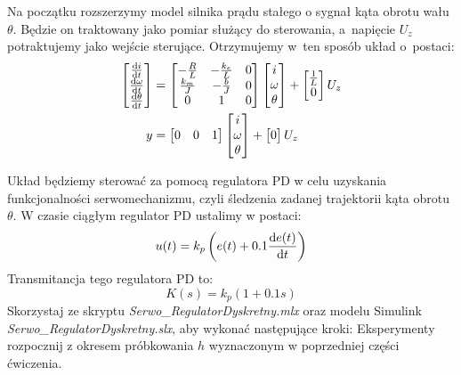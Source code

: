 \documentclass{sprawozdanie-agh}
\begin{document}
Na początku rozszerzymy model silnika prądu stałego o sygnał kąta obrotu wału $\theta$. Będzie on traktowany jako pomiar służący do sterowania, a~napięcie $U_z$ potraktujemy jako wejście sterujące. Otrzymujemy w~ten sposób układ o~postaci:
\begin{align*}
\begin{bmatrix} \dv{i}{t} \\  \dv{\omega}{t} \\ \dv{\theta}{t} \end{bmatrix} &= \begin{bmatrix} -\frac{R}{L} & -\frac{k_e}{L} & 0\\ \frac{k_m}{J} & -\frac{b}{J} & 0 \\ 0 & 1 & 0\end{bmatrix}\begin{bmatrix} i \\  \omega \\ \theta \end{bmatrix} + \begin{bmatrix} \frac{1}{L} \\ 0 \end{bmatrix} U_z  \\
y &= \begin{bmatrix} 0 & 0 &1  \end{bmatrix} \begin{bmatrix} i \\  \omega \\ \theta \end{bmatrix} + \begin{bmatrix} 0  \end{bmatrix} U_z 
\end{align*}

Układ będziemy sterować za pomocą regulatora PD w celu uzyskania funkcjonalności serwomechanizmu, czyli śledzenia zadanej trajektorii kąta obrotu $\theta$.
W czasie ciągłym regulator PD ustalimy w postaci:
\begin{equation*}
u(t) = k_p \left(e(t) + 0.1 \dv{e(t)}{t}\right)
\end{equation*}
Transmitancja tego regulatora PD to:
\begin{equation*}
K(s) = k_p \left(1 + 0.1s\right)
\end{equation*}
Skorzystaj ze skryptu \textit{Serwo{\_}RegulatorDyskretny.mlx} oraz modelu Simulink \textit{Serwo{\_}RegulatorDyskretny.slx}, aby wykonać następujące kroki:
Eksperymenty rozpocznij z okresem próbkowania $h$ wyznaczonym w poprzedniej części ćwiczenia.
\end{document}
